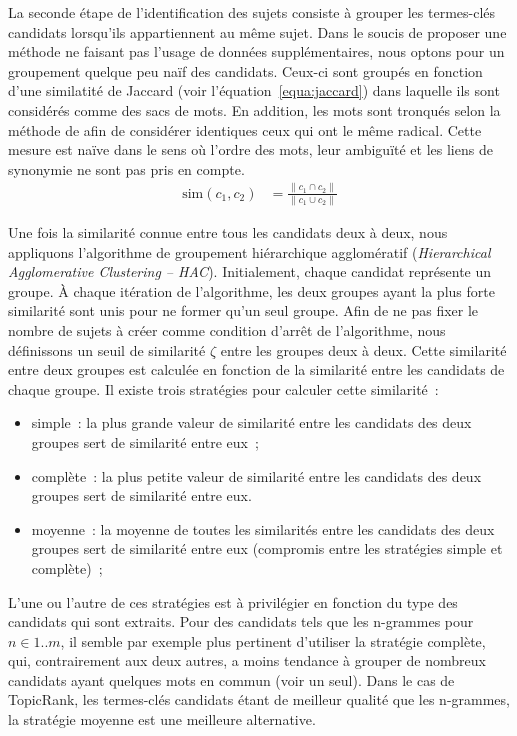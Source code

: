     La seconde étape de l'identification des sujets consiste à grouper les
    termes-clés candidats lorsqu'ils appartiennent au même sujet.
    Dans le soucis de proposer une méthode ne faisant pas l'usage de données
    supplémentaires, nous optons pour un groupement quelque peu naïf des
    candidats. Ceux-ci sont groupés en fonction d'une similatité de Jaccard
    (voir l'équation~\ref{equa:jaccard}) dans laquelle ils sont considérés comme
    des sacs de mots. En addition, les mots sont tronqués selon la méthode de
     afin de considérer identiques ceux qui
    ont le même radical. Cette mesure est naïve dans le sens où l'ordre des
    mots, leur ambiguïté et les liens de synonymie ne sont pas pris en compte.
    \begin{align}
      \text{sim}(c_1, c_2) &= \frac{\|c_1 \cap c_2\|}{\|c_1 \cup c_2\|} \label{equa:jaccard}
    \end{align}

    Une fois la similarité connue entre tous les candidats deux à deux, nous
    appliquons l'algorithme de groupement hiérarchique agglomératif
    (\textit{Hierarchical Agglomerative Clustering -- HAC}). Initialement,
    chaque candidat représente un groupe. À chaque itération de l'algorithme,
    les deux groupes ayant la plus forte similarité sont unis pour ne former
    qu'un seul groupe. Afin de ne pas fixer le nombre de sujets à créer comme
    condition d'arrêt de l'algorithme, nous définissons un seuil de similarité
    $\zeta$ entre les groupes deux à deux. Cette similarité entre deux groupes
    est calculée en fonction de la similarité entre les candidats de chaque
    groupe. Il existe trois stratégies pour calculer cette similarité~:
    \begin{itemize}
      \item{simple~: la plus grande valeur de similarité entre les candidats
            des deux groupes sert de similarité entre eux~;}
      \item{complète~: la plus petite valeur de similarité entre les candidats
            des deux groupes sert de similarité entre eux.}
      \item{moyenne~: la moyenne de toutes les similarités entre les
            candidats des deux groupes sert de similarité entre eux (compromis
            entre les stratégies simple et complète)~;}
    \end{itemize}
    L'une ou l'autre de ces stratégies est à privilégier en fonction du type des
    candidats qui sont extraits. Pour des candidats tels que les n-grammes pour
    $n \in 1..m$, il semble par exemple plus pertinent d'utiliser la stratégie
    complète, qui, contrairement aux deux autres, a moins tendance à grouper de
    nombreux candidats ayant quelques mots en commun (voir un seul). Dans le cas
    de TopicRank, les termes-clés candidats étant de meilleur qualité que les
    n-grammes, la stratégie moyenne est une meilleure alternative.

